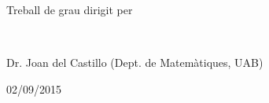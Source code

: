 \begin{titlepage}
\begin{center}


\vfill
\begin{minipage}{0.7\textwidth}
\begin{flushleft}
{Treball de grau dirigit per}
\end{flushleft}
\end{minipage}
\begin{minipage}{0.2\textwidth}
\begin{flushright}
{\phantom{s}}
\end{flushright}
\end{minipage}\\[0.3cm]
\begin{minipage}{0.7\textwidth}
\begin{flushleft}
{\large Dr. Joan del Castillo (Dept. de Matemàtiques, UAB) }
\end{flushleft}
\end{minipage}
\begin{minipage}{0.2\textwidth}
\begin{flushright}
{ 02/09/2015 }
\end{flushright}
\end{minipage}






\end{center}

\end{titlepage}
